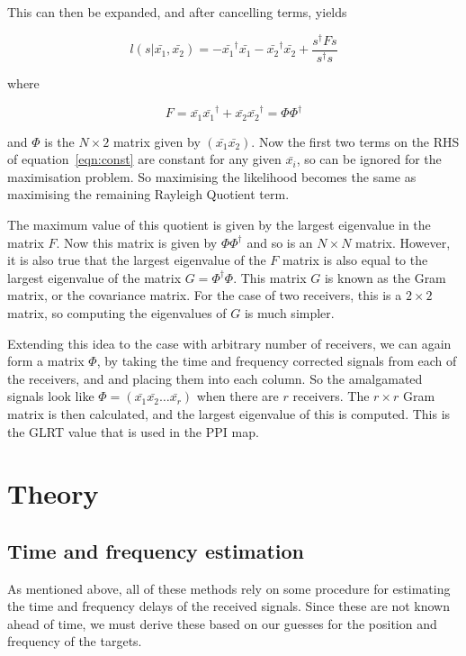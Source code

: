 \documentclass[12pt,openany,a4paper]{book}
\begin{document}
\bigskip

This can then be expanded, and after cancelling terms, yields

\begin{equation}
\label{eqn:const}
l(s | \bar{x_1}, \bar{x_2}) = - \bar{x_1}^\dagger \bar{x_1} - \bar{x_2}^\dagger \bar{x_2}
+ \frac{s^\dagger F s}{s^\dagger s}
\end{equation}

\bigskip

where

\begin{equation}
F = \bar{x_1}\bar{x_1}^\dagger + \bar{x_2}\bar{x_2}^\dagger = \Phi \Phi^\dagger
\end{equation}

\bigskip

and $\Phi$ is the $N\times2$ matrix given by $(\bar{x_1} \bar{x_2})$. Now the first two terms on the RHS of equation~\ref{eqn:const} are constant for any given $\bar{x_i}$, so can be ignored for the maximisation problem. So maximising the likelihood becomes the same as maximising the remaining Rayleigh Quotient term.

\medskip

The maximum value of this quotient is given by the largest eigenvalue in the matrix $F$. Now this matrix is given by $\Phi \Phi^\dagger$ and so is an $N\times N$ matrix. However, it is also true that the largest eigenvalue of the $F$ matrix is also equal to the largest eigenvalue of the matrix $G = \Phi^{\dagger} \Phi$. This matrix $G$ is known as the Gram matrix, or the covariance matrix. For the case of two receivers, this is a $2\times2$ matrix, so computing the eigenvalues of $G$ is much simpler.

\bigskip

Extending this idea to the case with arbitrary number of receivers, we can again form a matrix $\Phi$, by taking the time and frequency corrected signals from each of the receivers, and and placing them into each column. So the amalgamated signals look like $\Phi = (\bar{x_1} \bar{x_2} \ldots \bar{x_r} )$ when there are $r$ receivers. The $r\times r$ Gram matrix is then calculated, and the largest eigenvalue of this is computed. This is the GLRT value that is used in the PPI map.

\section{Theory}

\subsection{Time and frequency estimation}
\label{sec:TFE}
As mentioned above, all of these methods rely on some procedure for estimating the time and frequency delays of the received signals. Since these are not known ahead of time, we must derive these based on our guesses for the position and frequency of the targets.
\end{document}
